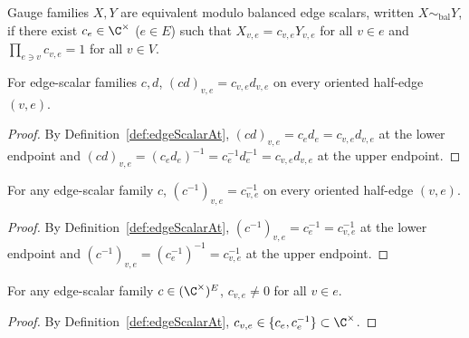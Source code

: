 \begin{definition}%
    \label{def:GaugeEquivModEdgeScalars}
    \leanok
    Gauge families $X,Y$ are equivalent modulo balanced edge scalars, written
    $X\sim_{\mathrm{bal}}Y$, if there exist $c_e\in\C^\times$ ($e\in E$) such
    that $X_{v,e}=c_{v,e}Y_{v,e}$ for all $v\in e$ and
    $\prod_{e\ni v}c_{v,e}=1$ for all $v\in V$.
\end{definition}

\begin{lemma}%
    \label{thm:edgeScalarAt_mul}
    \leanok
    For edge-scalar families $c,d$, $(cd)_{v,e}=c_{v,e}d_{v,e}$ on every
    oriented half-edge $(v,e)$.
\end{lemma}
\begin{proof}\leanok
    By Definition~\ref{def:edgeScalarAt}, $(cd)_{v,e}=c_ed_e=c_{v,e}d_{v,e}$ at
    the lower endpoint and $(cd)_{v,e}=(c_ed_e)^{-1}=c_e^{-1}d_e^{-1}=c_{v,e}d_{v,e}$
    at the upper endpoint.
\end{proof}

\begin{lemma}%
    \label{thm:edgeScalarAt_inv}
    \leanok
    For any edge-scalar family $c$, $(c^{-1})_{v,e}=c_{v,e}^{-1}$ on every
    oriented half-edge $(v,e)$.
\end{lemma}
\begin{proof}\leanok
    By Definition~\ref{def:edgeScalarAt}, $(c^{-1})_{v,e}=c_e^{-1}=c_{v,e}^{-1}$
    at the lower endpoint and $(c^{-1})_{v,e}=(c_e^{-1})^{-1}=c_{v,e}^{-1}$ at
    the upper endpoint.
\end{proof}

\begin{lemma}%
    \label{thm:edgeScalarAt_ne_zero}
    \leanok
    For any edge-scalar family $c\in(\C^\times)^E$, $c_{v,e}\ne 0$ for all $v\in e$.
\end{lemma}
\begin{proof}\leanok
    By Definition~\ref{def:edgeScalarAt}, $c_{v,e}\in\{c_e,c_e^{-1}\}\subset\C^\times$.
\end{proof}


